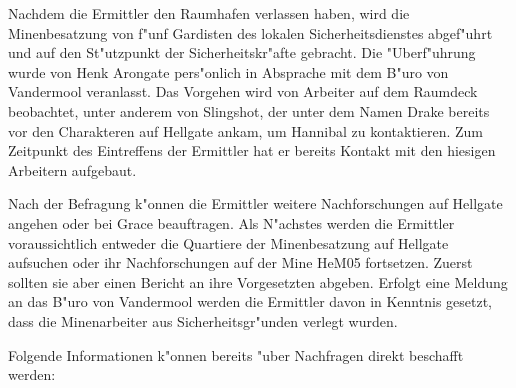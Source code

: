 Nachdem die Ermittler den Raumhafen verlassen haben, wird die Minenbesatzung von f"unf Gardisten des lokalen Sicherheitsdienstes abgef"uhrt und auf den St"utzpunkt der Sicherheitskr"afte gebracht. Die "Uberf"uhrung wurde von Henk Arongate pers"onlich in Absprache mit dem B"uro von Vandermool veranlasst. Das Vorgehen wird von Arbeiter auf dem Raumdeck beobachtet, unter anderem von Slingshot, der unter dem Namen Drake bereits vor den Charakteren auf Hellgate ankam, um Hannibal zu kontaktieren. Zum Zeitpunkt des Eintreffens der Ermittler hat er bereits Kontakt mit den hiesigen Arbeitern aufgebaut. 

Nach der Befragung k"onnen die Ermittler weitere Nachforschungen auf Hellgate angehen oder bei Grace beauftragen. Als N"achstes werden die Ermittler voraussichtlich entweder die Quartiere der Minenbesatzung auf Hellgate aufsuchen oder ihr Nachforschungen auf der Mine HeM05 fortsetzen. Zuerst sollten sie aber einen Bericht an ihre Vorgesetzten abgeben. Erfolgt eine Meldung an das B"uro von Vandermool werden die Ermittler davon in Kenntnis gesetzt, dass die Minenarbeiter aus Sicherheitsgr"unden verlegt wurden.


Folgende Informationen k"onnen bereits "uber Nachfragen direkt beschafft werden:


